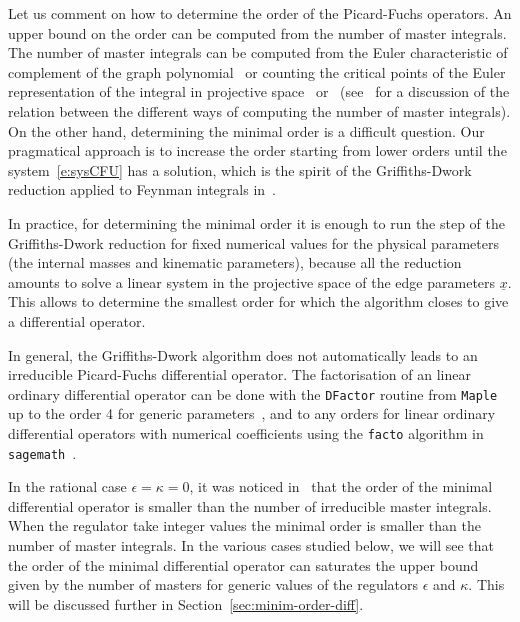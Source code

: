 \documentclass[a4paper,12pt]{article}
\numberwithin{equation}{section}
\numberwithin{figure}{section}
\begin{document}
\medskip
 
 Let us comment on how to determine the order of the Picard-Fuchs operators. An upper bound on the order can be computed
 from the number of master integrals.
 The number of master
integrals  can be computed from the Euler
characteristic of complement of the graph polynomial~\cite{Bitoun:2017nre} or counting the
critical points of the Euler representation of the integral in
projective
space~\cite{Lee:2013hzt,Cacciatori:2021nli}
or~\cite{Mastrolia:2018uzb,Frellesvig:2019uqt} (see~\cite{Agostini:2022cgv} for
a discussion of the relation between the different ways of computing the number of master
integrals). On the other hand, determining the minimal order is a
difficult question. Our pragmatical approach is to increase the order
starting from 
lower orders until the system~\eqref{e:sysCFU} has a solution, which is
the spirit of the Griffiths-Dwork reduction applied to Feynman
integrals in~\cite{Muller-Stach:2011qkg}.

In practice, for determining the minimal order it is enough to run the step of the
Griffiths-Dwork reduction for fixed numerical values for the physical
parameters (the internal masses and kinematic
parameters), because all the reduction amounts to solve a linear system in the projective space of
the edge parameters $\underline x$. This allows to determine the smallest order for which the
algorithm closes to give a differential operator.

In general, the Griffiths-Dwork algorithm does not automatically
leads to an irreducible Picard-Fuchs differential operator.
The factorisation of an linear ordinary
differential operator can be done with the {\tt DFactor} routine from
{\tt Maple} up to the order 4 for generic parameters~\cite{PutSinger,vanHoeij}, and to any
orders for linear  ordinary
differential operators with numerical coefficients
using the {\tt facto} algorithm in {\tt
	sagemath}~\cite{chyzak2022symbolic,goyer2021sage}.


 In the rational case $\epsilon=\kappa=0$, it was noticed
in~\cite{Bloch:2013tra,Bloch:2016izu,Bloch:2014qca,Lairez:2022zkj} that the order of the minimal differential operator is
smaller than the number of irreducible master integrals.
When the regulator take integer values the minimal order is smaller
than the number of master integrals. 
In the various cases studied below,
we will see that the order of the minimal differential operator can saturates
the upper bound given by the number of masters for generic values of
the regulators  $\epsilon$  and $\kappa$. 
This will
      be discussed further in Section~\ref{sec:minim-order-diff}.
\end{document}
